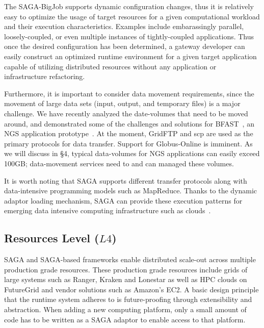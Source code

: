 \documentclass[]{svjour3}
\begin{document}
The SAGA-BigJob supports dynamic configuration changes, thus it is
relatively easy to optimize the usage of target resources for a given
computational workload and their execution characteristics. Examples include
embarassingly parallel, loosely-coupled, or even multiple instances of
tightly-coupled applications. Thus once the desired configuration has
been determined, a gateway developer can easily construct an optimized
runtime environment for a given target application capable of
utilizing distributed resources without any application or
infrastructure refactoring.

Furthermore, it is important to consider data movement requirements,
since the movement of large data sets (input, output, and temporary
files) is a major challenge. We have recently analyzed the
date-volumes that need to be moved around, and demonstrated some of
the challenges and solutions for BFAST~\cite{dare-ecmls11}, an NGS
application prototype~. At the moment,
GridFTP and scp are used as the primary protocols for data
transfer. Support for Globus-Online is imminent. As we will discuss in
\S4, typical data-volumes for NGS applications can easily exceed
100GB; data-movement services need to and can managed these
volumes.~

It is worth noting that SAGA supports different transfer protocols
along with data-intensive programming models such as MapReduce.
Thanks to the dynamic adaptor loading mechanism, SAGA can provide
these execution patterns for emerging data intensive computing
infrastructure such as clouds~\cite{bigjob_cloudcom10,saga_bigjob_condor_cloud}.

\subsection{Resources Level ($L4$)} 

SAGA and SAGA-based frameworks enable distributed scale-out across
multiple production grade resources. These production grade resources
include grids of large systems such as Ranger, Kraken and Lonestar as
well as HPC clouds on FutureGrid and vendor solutions such as Amazon's
EC2. A basic design principle that the runtime system adheres to is
future-proofing through extensibility and abstraction. When adding a
new computing platform, only a small amount of code has to be written
as a SAGA adaptor to enable access to that platform.
\end{document}
